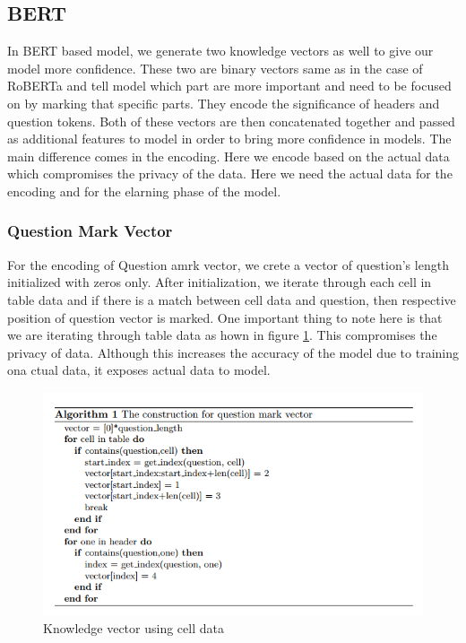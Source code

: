 \documentclass[12pt]{article}
\begin{document}
\subsection{BERT}
In BERT based model, we generate two knowledge vectors as well to give our model more confidence. These two are binary vectors same as in the case of RoBERTa and tell model which part are more important and need to be focused on by marking that specific parts. They encode the significance of headers and question tokens. Both of these vectors are then concatenated together and passed as additional features to model in order to bring more confidence in models. The main difference comes in the encoding. Here we encode based on the actual data which compromises the privacy of the data. Here we need the actual data for the encoding and for the elarning phase of the model. 

\subsubsection{Question Mark Vector}
For the encoding of Question amrk vector, we crete a vector of question's length initialized with zeros only. After initialization, we iterate through each cell in table data and if there is a match between cell data and question, then respective position of question vector is marked. One important thing to note here is that we are iterating through table data as hown in figure \ref{cellfeature1}. This compromises the privacy of data. Although this increases the accuracy of the model due to training ona ctual data, it exposes actual data to model. 

\begin{figure}[H]
    \includegraphics[width=400pt]{cellfeature}
    \caption{Knowledge vector using cell data}
    \label{cellfeature1}
\end{figure}
\end{document}
